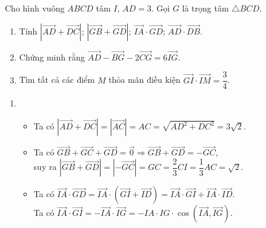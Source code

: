 \begin{bt}%
Cho hình vuông $ABCD$ tâm $I$, $AD=3$. Gọi $G$ là trọng tâm $\triangle BCD$.
\begin{enumerate}
\item Tính $\left|\overrightarrow{AD}+\overrightarrow{DC}\right|$; $\left|\overrightarrow{GB}+\overrightarrow{GD}\right|$; $\overrightarrow{IA}\cdot\overrightarrow{GD}$; $\overrightarrow{AD}\cdot\overrightarrow{DB}$.
\item Chứng minh rằng $\overrightarrow{AD}-\overrightarrow{BG}-2\overrightarrow{CG}=6\overrightarrow{IG}$.
\item Tìm tất cả các điểm $M$ thỏa mãn điều kiện $\overrightarrow{GI}\cdot\overrightarrow{IM}=\dfrac{3}{4}$.
\end{enumerate}
\loigiai
{
\begin{enumerate}
\item
\immini
{
\begin{itemize}
\item Ta có $\left|\overrightarrow{AD}+\overrightarrow{DC}\right|=\left|\overrightarrow{AC}\right|=AC=\sqrt{AD^2+DC^2}=3\sqrt{2}$.
\item Ta có $\overrightarrow{GB}+\overrightarrow{GC}+\overrightarrow{GD}=\overrightarrow{0} \Rightarrow \overrightarrow{GB}+\overrightarrow{GD}=-\overrightarrow{GC}$, \\
suy ra $\left|\overrightarrow{GB}+\overrightarrow{GD}\right|=\left|-\overrightarrow{GC}\right|=GC=\dfrac{2}{3}CI=\dfrac{1}{3}AC=\sqrt{2}$.
\item Ta có $\overrightarrow{IA}\cdot\overrightarrow{GD}=\overrightarrow{IA}\cdot\left(\overrightarrow{GI}+\overrightarrow{ID}\right)=\overrightarrow{IA}\cdot\overrightarrow{GI}+\overrightarrow{IA}\cdot\overrightarrow{ID}$. \\
Ta có $\overrightarrow{IA}\cdot\overrightarrow{GI}=-\overrightarrow{IA}\cdot\overrightarrow{IG}=-IA\cdot IG\cdot\cos\left(\overrightarrow{IA},\overrightarrow{IG}\right)$. \\

\end{itemize}}
\end{enumerate}}
\end{bt}
